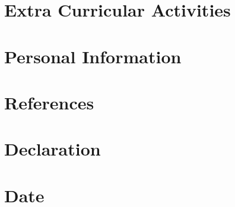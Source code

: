 \documentclass[11pt,a4paper,sans]{moderncv}        %
\begin{document}
\section{Extra Curricular Activities}

\section{Personal Information}

\section{References}

\section{Declaration}

\section{Date}
\end{document}
